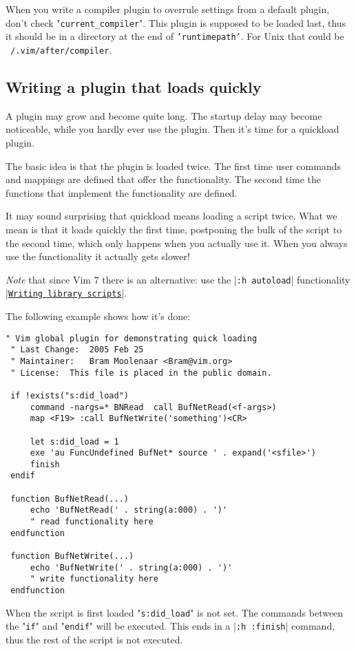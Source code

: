 When you write a compiler plugin to overrule settings from a default plugin, don't check "\texttt{current\_compiler}".
This plugin is supposed to be loaded last, thus it should be in a directory at the end of \texttt{'runtimepath'}.
For Unix that could be \texttt{~/.vim/after/compiler}.
\subsection{Writing a plugin that loads quickly}
\label{write-plugin-quickload}
A plugin may grow and become quite long.
The startup delay may become noticeable, while you hardly ever use the plugin.
Then it's time for a quickload plugin.

The basic idea is that the plugin is loaded twice.
The first time user commands and mappings are defined that offer the functionality.
The second time the functions that implement the functionality are defined.

It may sound surprising that quickload means loading a script twice.
What we mean is that it loads quickly the first time, postponing the bulk of the script to the second time, which only happens when you actually use it.
When you always use the functionality it actually gets slower!

\emph{Note} that since Vim 7 there is an alternative: use the |\texttt{:h autoload}| functionality |\hyperref[Writing library scripts]{\texttt{Writing library scripts}}|.

The following example shows how it's done:

\begin{Verbatim}[samepage=true]
 " Vim global plugin for demonstrating quick loading
 " Last Change:  2005 Feb 25
 " Maintainer:   Bram Moolenaar <Bram@vim.org>
 " License:  This file is placed in the public domain.

 if !exists("s:did_load")
     command -nargs=* BNRead  call BufNetRead(<f-args>)
     map <F19> :call BufNetWrite('something')<CR>

     let s:did_load = 1
     exe 'au FuncUndefined BufNet* source ' . expand('<sfile>')
     finish
 endif

 function BufNetRead(...)
     echo 'BufNetRead(' . string(a:000) . ')'
     " read functionality here
 endfunction

 function BufNetWrite(...)
     echo 'BufNetWrite(' . string(a:000) . ')'
     " write functionality here
 endfunction
\end{Verbatim}

When the script is first loaded "\texttt{s:did\_load}" is not set.
The commands between the "\texttt{if}" and "\texttt{endif}" will be executed.
This ends in a |\texttt{:h :finish}| command, thus the rest of the script is not executed.

